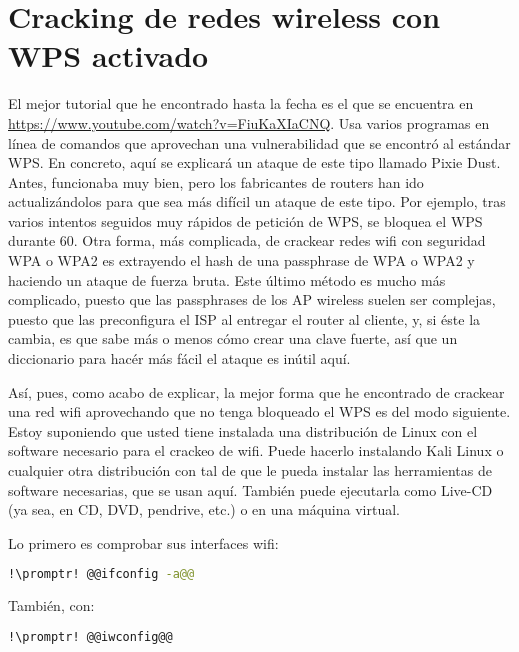 \section{Cracking de redes wireless con WPS activado}\label{sec:crack-wps}
El mejor tutorial que he encontrado hasta la fecha es el que se encuentra en
\url{https://www.youtube.com/watch?v=FiuKaXIaCNQ}. Usa varios programas en línea de comandos que aprovechan una
vulnerabilidad que se encontró al estándar WPS. En concreto, aquí se explicará un ataque de este tipo llamado
\foreignlanguage{english}{Pixie Dust}. Antes, funcionaba muy bien, pero los fabricantes de routers han ido
actualizándolos para que sea más difícil un ataque de este tipo. Por ejemplo, tras varios intentos seguidos muy
rápidos de petición de WPS, se bloquea el WPS durante \SI{60}{\sec}. Otra forma, más complicada, de crackear
redes wifi con seguridad WPA o WPA2 es extrayendo el hash de una passphrase de WPA o WPA2 y haciendo un ataque
de fuerza bruta. Este último método es mucho más complicado, puesto que las passphrases de los AP wireless
suelen ser complejas, puesto que las preconfigura el ISP al entregar el router al cliente, y, si éste la cambia,
es que sabe más o menos cómo crear una clave fuerte, así que un diccionario para hacér más fácil el ataque es
inútil aquí.

Así, pues, como acabo de explicar, la mejor forma que he encontrado de crackear una red wifi aprovechando que
no tenga bloqueado el WPS es del modo siguiente. Estoy suponiendo que usted tiene instalada una distribución de
Linux con el software necesario para el crackeo de wifi. Puede hacerlo instalando Kali Linux o cualquier otra
distribución con tal de que le pueda instalar las herramientas de software necesarias, que se usan aquí. También
puede ejecutarla como Live-CD (ya sea, en CD, DVD, pendrive, etc.) o en una máquina virtual.

Lo primero es comprobar sus interfaces wifi:

\begin{lstlisting}[gobble=2,language=bash,style=bashinteract,escapechar=!]
  !\promptr! @@ifconfig -a@@
\end{lstlisting}

\noindent También, con:

\begin{lstlisting}[gobble=2,language=bash,style=bashinteract,escapechar=!]
  !\promptr! @@iwconfig@@
\end{lstlisting}

